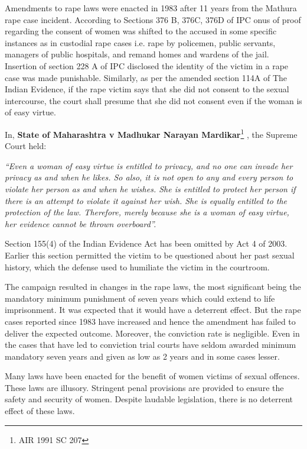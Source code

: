 \begin{multicols}{2}
\noi
Amendments to rape laws were enacted in 1983 after 11 years from the Mathura rape
case incident. According to Sections 376 B, 376C, 376D of IPC onus of proof regarding
the consent of women was shifted to the accused in some specific instances as in
custodial rape cases i.e. rape by policemen, public servants, managers of public
hospitals, and remand homes and wardens of the jail. Insertion of section 228 A of IPC
disclosed the identity of the victim in a rape case was made punishable. Similarly, as
per the amended section 114A of The Indian Evidence, if the rape victim says that she
did not consent to the sexual intercourse, the court shall presume that she did not
consent even if the woman is of easy virtue.

\noi
In, {\bf State of Maharashtra v Madhukar Narayan Mardikar}\footnote{AIR 1991 SC 207}
, the Supreme Court
held:

\noi
\textit{“Even a woman of easy virtue is entitled to privacy, and no one can invade her privacy
as and when he likes. So also, it is not open to any and every person to violate her
person as and when he wishes. She is entitled to protect her person if there is an attempt
to violate it against her wish. She is equally entitled to the protection of the law.
Therefore, merely because she is a woman of easy virtue, her evidence cannot be
thrown overboard”.}

\noi
Section 155(4) of the Indian Evidence Act has been omitted by Act 4 of 2003. Earlier
this section permitted the victim to be questioned about her past sexual history, which
the defense used to humiliate the victim in the courtroom.

\noi
The campaign resulted in changes in the rape laws, the most significant being the
mandatory minimum punishment of seven years which could extend to life
imprisonment. It was expected that it would have a deterrent effect. But the rape cases
reported since 1983 have increased and hence the amendment has failed to deliver the
expected outcome. Moreover, the conviction rate is negligible. Even in the cases that
have led to conviction trial courts have seldom awarded minimum mandatory seven
years and given as low as 2 years and in some cases lesser.

\noi
Many laws have been enacted for the benefit of women victims of sexual offences.
These laws are illusory. Stringent penal provisions are provided to ensure the safety
and security of women. Despite laudable legislation, there is no deterrent effect of these
laws.


\end{multicols}

